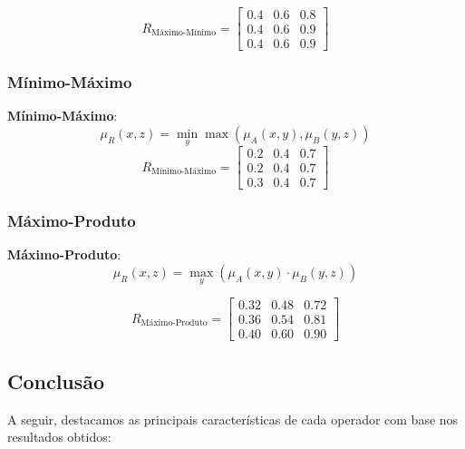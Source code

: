 \documentclass[a4paper,12pt]{article}
\begin{document}
\[
R_{\text{Máximo-Mínimo}} =
\begin{bmatrix}
0.4 & 0.6 & 0.8 \\
0.4 & 0.6 & 0.9 \\
0.4 & 0.6 & 0.9
\end{bmatrix}
\]

\subsubsection{Mínimo-Máximo}

\textbf{Mínimo-Máximo}:
    \[
    \mu_R(x, z) = \min_y \max(\mu_A(x, y), \mu_B(y, z))
    \]
\[
R_{\text{Mínimo-Máximo}} =
\begin{bmatrix}
0.2 & 0.4 & 0.7 \\
0.2 & 0.4 & 0.7 \\
0.3 & 0.4 & 0.7
\end{bmatrix}
\]

\subsubsection{Máximo-Produto}

\textbf{Máximo-Produto}:
    \[
    \mu_R(x, z) = \max_y (\mu_A(x, y) \cdot \mu_B(y, z))
    \]

\[
R_{\text{Máximo-Produto}} =
\begin{bmatrix}
0.32 & 0.48 & 0.72 \\
0.36 & 0.54 & 0.81 \\
0.40 & 0.60 & 0.90
\end{bmatrix}
\]
\subsection{Conclusão}

A seguir, destacamos as principais características de cada operador com base nos resultados obtidos:
\end{document}
